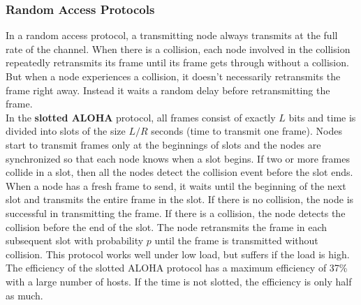 \subsubsection{Random Access Protocols}
In a random access protocol, a transmitting node always transmits at the full rate of the channel. When there is a collision, each node involved in the collision repeatedly retransmits its frame until its frame gets through without a collision. But when a node experiences a collision, it doesn't necessarily retransmits the frame right away. Instead it waits a random delay before retransmitting the frame. \vspace{.3cm}\\
In the \textbf{slotted ALOHA} protocol, all frames consist of exactly $L$ bits and time is divided into slots of the size $L/R$ seconds (time to transmit one frame). Nodes start to transmit frames only at the beginnings of slots and the nodes are synchronized so that each node knows when a slot begins. If two or more frames collide in a slot, then all the nodes detect the collision event before the slot ends. When a node has a fresh frame to send, it waits until the beginning of the next slot and transmits the entire frame in the slot. If there is no collision, the node is successful in transmitting the frame. If there is a collision, the node detects the collision before the end of the slot. The node retransmits the frame in each subsequent slot with probability $p$ until the frame is transmitted without collision.
This protocol works well under low load, but suffers if the load is high. The efficiency of the slotted ALOHA protocol has a maximum efficiency of 37\% with a large number of hosts. If the time is not slotted, the efficiency is only half as much.\vspace{.3cm}\\

